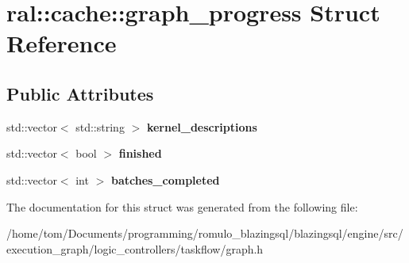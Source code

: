 \hypertarget{structral_1_1cache_1_1graph__progress}{}\section{ral\+:\+:cache\+:\+:graph\+\_\+progress Struct Reference}
\label{structral_1_1cache_1_1graph__progress}
\subsection*{Public Attributes}
\begin{DoxyCompactItemize}
\item 
\mbox{\label{structral_1_1cache_1_1graph__progress_afe755dbb160094c2e7aace654cfa0bac}} 
std\+::vector$<$ std\+::string $>$ {\bfseries kernel\+\_\+descriptions}
\item 
\mbox{\label{structral_1_1cache_1_1graph__progress_ac9cad17f41a341135275ed5e97235b1b}} 
std\+::vector$<$ bool $>$ {\bfseries finished}
\item 
\mbox{\label{structral_1_1cache_1_1graph__progress_a4bbc49809dcfabb2badaa51ae1912433}} 
std\+::vector$<$ int $>$ {\bfseries batches\+\_\+completed}
\end{DoxyCompactItemize}


The documentation for this struct was generated from the following file\+:\begin{DoxyCompactItemize}
\item 
/home/tom/\+Documents/programming/romulo\+\_\+blazingsql/blazingsql/engine/src/execution\+\_\+graph/logic\+\_\+controllers/taskflow/graph.\+h\end{DoxyCompactItemize}
